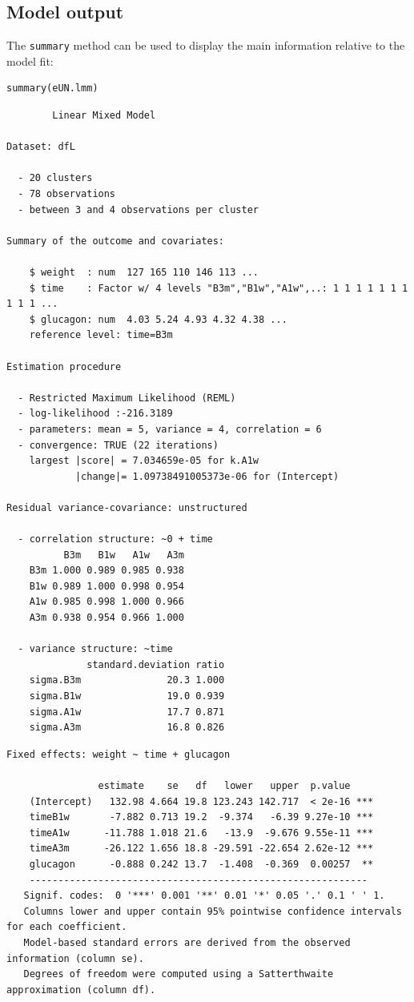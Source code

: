 \documentclass[12pt]{article}
\begin{document}
\subsection{Model output}
\label{sec:org4750893}

The \texttt{summary} method can be used to display the main information
relative to the model fit:
\lstset{language=r,label= ,caption= ,captionpos=b,numbers=none}
\begin{lstlisting}
summary(eUN.lmm)
\end{lstlisting}

\begin{verbatim}
		Linear Mixed Model 
 
Dataset: dfL 

  - 20 clusters 
  - 78 observations 
  - between 3 and 4 observations per cluster 

Summary of the outcome and covariates: 

    $ weight  : num  127 165 110 146 113 ...
    $ time    : Factor w/ 4 levels "B3m","B1w","A1w",..: 1 1 1 1 1 1 1 1 1 1 ...
    $ glucagon: num  4.03 5.24 4.93 4.32 4.38 ...
    reference level: time=B3m 

Estimation procedure 

  - Restricted Maximum Likelihood (REML) 
  - log-likelihood :-216.3189
  - parameters: mean = 5, variance = 4, correlation = 6
  - convergence: TRUE (22 iterations) 
    largest |score| = 7.034659e-05 for k.A1w
            |change|= 1.09738491005373e-06 for (Intercept)
 
Residual variance-covariance: unstructured 

  - correlation structure: ~0 + time 
          B3m   B1w   A1w   A3m
    B3m 1.000 0.989 0.985 0.938
    B1w 0.989 1.000 0.998 0.954
    A1w 0.985 0.998 1.000 0.966
    A3m 0.938 0.954 0.966 1.000

  - variance structure: ~time 
              standard.deviation ratio
    sigma.B3m               20.3 1.000
    sigma.B1w               19.0 0.939
    sigma.A1w               17.7 0.871
    sigma.A3m               16.8 0.826
\end{verbatim}

\clearpage

\begin{verbatim}
Fixed effects: weight ~ time + glucagon 
 
                estimate    se   df   lower   upper  p.value    
    (Intercept)   132.98 4.664 19.8 123.243 142.717  < 2e-16 ***
    timeB1w       -7.882 0.713 19.2  -9.374   -6.39 9.27e-10 ***
    timeA1w      -11.788 1.018 21.6   -13.9  -9.676 9.55e-11 ***
    timeA3m      -26.122 1.656 18.8 -29.591 -22.654 2.62e-12 ***
    glucagon      -0.888 0.242 13.7  -1.408  -0.369  0.00257  **
    ----------------------------------------------------------- 
   Signif. codes:  0 '***' 0.001 '**' 0.01 '*' 0.05 '.' 0.1 ' ' 1.
   Columns lower and upper contain 95% pointwise confidence intervals for each coefficient.
   Model-based standard errors are derived from the observed information (column se). 
   Degrees of freedom were computed using a Satterthwaite approximation (column df).
\end{verbatim}
\end{document}
